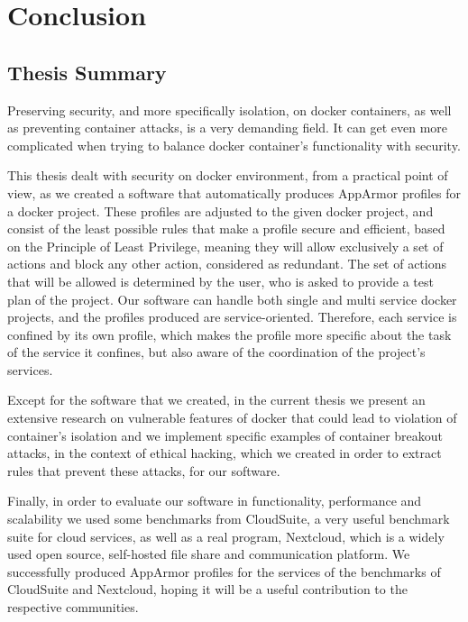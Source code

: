 \chapter{Conclusion}

\section{Thesis Summary}

Preserving security, and more specifically isolation, on docker containers, as well as preventing container attacks, is a very demanding field. It can get even more complicated when trying to balance docker container's functionality with security.

This thesis dealt with security on docker environment, from a practical point of view, as we created a software that automatically produces AppArmor profiles for a docker project. These profiles are adjusted to the given docker project, and consist of the least possible rules that make a profile secure and efficient, based on the Principle of Least Privilege, meaning they will allow exclusively a set of actions and block any other action, considered as redundant. The set of actions that will be allowed is determined by the user, who is asked to provide a test plan of the project. Our software can handle both single and multi service docker projects, and the profiles produced are service-oriented. Therefore, each service is confined by its own profile, which makes the profile more specific about the task of the service it confines, but also aware of the coordination of the project's services.

Except for the software that we created, in the current thesis we present an extensive research on vulnerable features of docker that could lead to violation of container's isolation and we implement specific examples of container breakout attacks, in the context of ethical hacking, which we created in order to extract rules that prevent these attacks, for our software.

Finally, in order to evaluate our software in functionality, performance and scalability we used some benchmarks from CloudSuite, a very useful benchmark suite for cloud services, as well as a real program, Nextcloud, which is a widely used open source, self-hosted file share and communication platform. We successfully produced AppArmor profiles for the services of the benchmarks of CloudSuite and Nextcloud, hoping it will be a useful contribution to the respective communities.

